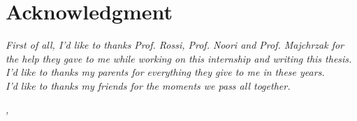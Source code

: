 \documentclass[../thesis.tex]{subfiles}
\begin{document}
    \cleardoublepage

    \bigskip

    \begingroup
    \let\clearpage\relax
    \let\cleardoublepage\relax
    \let\cleardoublepage\relax

    \chapter*{Acknowledgment}
    \noindent \textit{First of all, I'd like to thanks Prof. Rossi, Prof. Noori and Prof. Majchrzak for the help they gave to me while working on this internship and writing this thesis.}\\

    \noindent \textit{I'd like to thanks my parents for everything they give to me in these years.}\\

    \noindent \textit{I'd like to thanks my friends for the moments we pass all together.}\\
    \bigskip

    \noindent\textit{\myLocation, \myTime}
    \hfill \myName

    \endgroup
\end{document}
